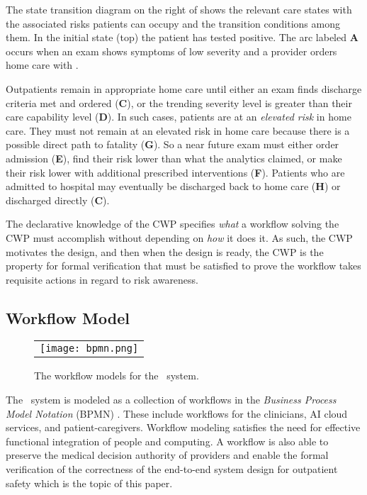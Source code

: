 The state transition diagram on the right of  shows the relevant care states with the associated risks patients can occupy and the transition conditions among them. In the initial state (top) the patient has tested positive. The arc labeled \textbf{A} occurs when an exam shows symptoms of low severity and a provider orders home care with \phware. 

Outpatients remain in appropriate home care until either an exam finds discharge criteria met and ordered (\textbf{C}), or the trending severity level is greater than their care capability level (\textbf{D}). In such cases, patients are at an \emph{elevated risk} in home care. They must not remain at an elevated risk in home care because there is a possible direct path to fatality (\textbf{G}). So a near future exam must either order admission (\textbf{E}), find their risk lower than what the analytics claimed, or make their risk lower with additional prescribed interventions (\textbf{F}). Patients who are admitted to hospital may eventually be discharged back to home care (\textbf{H}) or discharged directly (\textbf{C}). 

The declarative knowledge of the CWP specifies \emph{what} a workflow solving the CWP must accomplish without depending on \emph{how} it does it. As such, the CWP motivates the design, and then when the design is ready, the CWP is the property for formal verification that must be satisfied to prove the workflow takes requisite actions in regard to risk awareness.

\subsection{Workflow Model}
\begin{figure*}
  \begin{center}
    \begin{tabular}{c}
      \texttt{[image: bpmn.png]}
    \end{tabular}
  \end{center}
\caption{The workflow models for the \phware\ system.}
\label{fig:bpmn}
\end{figure*}

The \phware\ system is modeled as a collection of workflows in the \emph{Business Process Model Notation} (BPMN) \cite{BPMNSpecification}. These include workflows for the clinicians, AI cloud services, and patient-caregivers. Workflow modeling satisfies the need for effective functional integration of people and computing. A workflow is also able to preserve the medical decision authority of providers and enable the formal verification of the correctness of the end-to-end system design for outpatient safety which is the topic of this paper.

